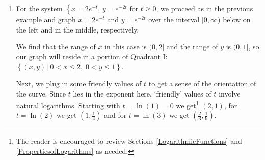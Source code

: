 \documentclass{ximera}
\begin{document}
\begin{example}
\begin{explanation}
\begin{enumerate}
 

 More generally, we see that $x = t^3$ is \textit{increasing} over the entire interval $[-1,1]$ whereas $y = 2t^2$  is \textit{decreasing} over the interval $[-1,0]$ and then \textit{increasing} over $[0,1]$.  
 
  
 
 Geometrically, this means that in order to trace out the path described by the parametric equations, we start at $(-1,2)$ (where $t=-1$), then move to the right (since $x$ is increasing) and down (since $y$ is decreasing) to $(0,0)$ (where $t = 0$). 
 
  
 
 We continue to move to the right (since $x$ is still increasing) but now move upwards (since $y$ is now increasing) until we reach $(1,2)$ (where $t=1$).  
 
  
 
  Finally, to get a good sense of the shape of the curve, we eliminate the parameter.  Solving $x = t^3$ for $t$, we get $t = \sqrt[3]{x}$. Substituting this into $y = 2t^2$ gives $y = 2(\sqrt[3]{x})^2 =  2x^{2/3}$. Our experience in Section \ref{PowerFunctions} yields the graph of our final answer below on the right.
  
\begin{center}
\end{center}




\item  For the system $\left\{ x = 2e^{-t}, \, y=e^{-2t} \right.$ for $t \geq 0$, we proceed as in the previous example and graph $x = 2e^{-t}$ and $y = e^{-2t}$ over the interval $[0, \infty)$ below on the left and in the middle, respectively.

 

  We find that the range of $x$ in this case is $(0,2]$ and the range of $y$ is $(0,1]$, so our graph will reside in a portion of  Quadrant I: $\left\{ (x,y) \, | \, 0 < x \leq 2, \; 0 < y \leq 1 \right\}$. 
  
   
  
  Next, we plug in some friendly values of $t$ to get a sense of the orientation of the curve.  Since $t$ lies in the exponent here, `friendly' values of $t$ involve natural logarithms.   Starting with $t=\ln(1) = 0$ we get\footnote{The reader is encouraged to review Sections \ref{LogarithmicFunctions} and \ref{PropertiesofLogarithms} as needed.} $(2,1)$, for $t = \ln(2)$ we get $\left(1,\frac{1}{4}\right)$ and for $t = \ln(3)$ we get $\left(\frac{2}{3}, \frac{1}{9}\right)$. 
  

\end{enumerate}
\end{explanation}
\end{example}
\end{document}
